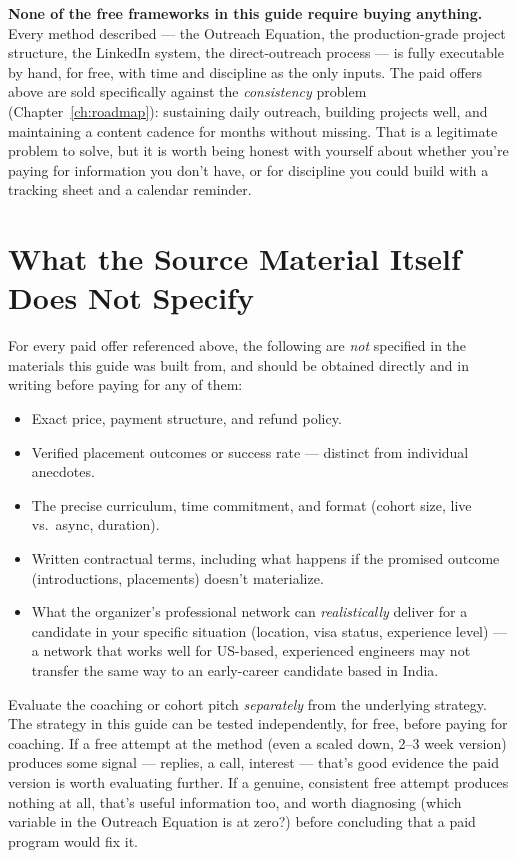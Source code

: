 \begin{caution}
\textbf{None of the free frameworks in this guide require buying anything.} Every method described --- the
Outreach Equation, the production-grade project structure, the LinkedIn system, the direct-outreach process --- is
fully executable by hand, for free, with time and discipline as the only inputs. The paid offers above are sold
specifically against the \emph{consistency} problem (Chapter~\ref{ch:roadmap}): sustaining daily outreach,
building projects well, and maintaining a content cadence for months without missing. That is a legitimate
problem to solve, but it is worth being honest with yourself about whether you're paying for information you
don't have, or for discipline you could build with a tracking sheet and a calendar reminder.
\end{caution}

\section{What the Source Material Itself Does Not Specify}

For every paid offer referenced above, the following are \emph{not} specified in the materials this guide was
built from, and should be obtained directly and in writing before paying for any of them:

\begin{itemize}
  \item Exact price, payment structure, and refund policy.
  \item Verified placement outcomes or success rate --- distinct from individual anecdotes.
  \item The precise curriculum, time commitment, and format (cohort size, live vs.\ async, duration).
  \item Written contractual terms, including what happens if the promised outcome (introductions, placements)
  doesn't materialize.
  \item What the organizer's professional network can \emph{realistically} deliver for a candidate in your
  specific situation (location, visa status, experience level) --- a network that works well for US-based,
  experienced engineers may not transfer the same way to an early-career candidate based in India.
\end{itemize}

\begin{keytakeaway}
Evaluate the coaching or cohort pitch \emph{separately} from the underlying strategy. The strategy in this guide
can be tested independently, for free, before paying for coaching. If a free attempt at the method (even a scaled
down, 2--3 week version) produces some signal --- replies, a call, interest --- that's good evidence the paid
version is worth evaluating further. If a genuine, consistent free attempt produces nothing at all, that's useful
information too, and worth diagnosing (which variable in the Outreach Equation is at zero?) before concluding that
a paid program would fix it.
\end{keytakeaway}

